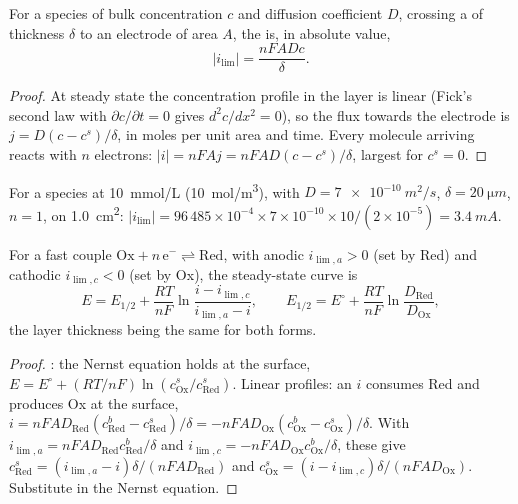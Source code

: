 \begin{theorem}\label{thm:b2:current-potential-curves:limiting}
For a species of bulk concentration $c$ and diffusion coefficient $D$,
crossing a  of thickness $\delta$ to an electrode of area $A$,
the  is, in absolute value,
\[
  |i_{\lim}| = \frac{nFADc}{\delta} .
\]
\end{theorem}

\begin{proof}
At steady state the concentration profile in the layer is linear (Fick's
second law with $\partial c/\partial t = 0$ gives $d^2c/dx^2 = 0$), so the flux
towards the electrode is $j = D(c - c^s)/\delta$, in moles per unit area and
time. Every molecule arriving reacts with $n$ electrons: $|i| = nFAj =
nFAD(c - c^s)/\delta$, largest for $c^s = 0$.
\end{proof}

\begin{example}\label{ex:b2:current-potential-curves:ilim}
For a species at \qty{10}{mmol/L} (\qty{10}{mol/m^3}), with $D =
\qty{7e-10}{m^2/s}$, $\delta = \qty{20}{\micro m}$, $n = 1$, on
\qty{1.0}{cm^2}: $|i_{\lim}| = 96\,485 \times 10^{-4} \times 7 \times 10^{-10}
\times 10/(2 \times 10^{-5}) = \qty{3.4}{mA}$.
\end{example}

\begin{theorem}\label{thm:b2:current-potential-curves:wave}
For a fast couple $\mathrm{Ox} + n\,\mathrm e^- \rightleftharpoons \mathrm{Red}$,
with anodic  $i_{\lim,a} > 0$ (set by Red) and cathodic
 $i_{\lim,c} < 0$ (set by Ox), the steady-state curve is
\[
  E = E_{1/2} + \frac{RT}{nF}\ln\frac{i - i_{\lim,c}}{i_{\lim,a} - i},
  \qquad E_{1/2} = E^\circ + \frac{RT}{nF}\ln\frac{D_{\text{Red}}}{D_{\text{Ox}}} ,
\]
the layer thickness being the same for both forms.
\end{theorem}

\begin{proof}
: the Nernst equation holds at the surface, $E = E^\circ + (RT/nF)
\ln(c^s_{\text{Ox}}/c^s_{\text{Red}})$. Linear profiles: an  $i$
consumes Red and produces Ox at the surface, $i = nFAD_{\text{Red}}(c^b_{\text{Red}}
- c^s_{\text{Red}})/\delta = -nFAD_{\text{Ox}}(c^b_{\text{Ox}} - c^s_{\text{Ox}})/\delta$.
With $i_{\lim,a} = nFAD_{\text{Red}}c^b_{\text{Red}}/\delta$ and $i_{\lim,c} =
-nFAD_{\text{Ox}}c^b_{\text{Ox}}/\delta$, these give $c^s_{\text{Red}} = (i_{\lim,a} -
i)\delta/(nFAD_{\text{Red}})$ and $c^s_{\text{Ox}} = (i - i_{\lim,c})\delta/(nFAD_{\text{Ox}})$.
Substitute in the Nernst equation.
\end{proof}

